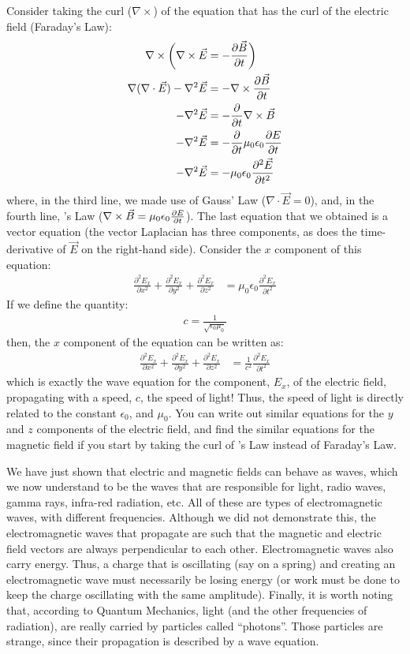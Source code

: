 Consider taking the curl ($\nabla \times$) of the equation that has the curl of the electric field (Faraday's Law):
\begin{align*}
\nabla \times \bigg(\nabla \times \vec E &= -\frac{\partial \vec B}{\partial t}\bigg)\\
\nabla(\nabla\cdot \vec E)-\nabla^2\vec E &= -\nabla \times \frac{\partial \vec B}{\partial t}\\
-\nabla^2\vec E &= - \frac{\partial }{\partial t} \nabla \times \vec B\\
-\nabla^2\vec E &= - \frac{\partial }{\partial t} \mu_0 \epsilon_0\frac{\partial E}{\partial t}\\
-\nabla^2\vec E &= - \mu_0 \epsilon_0\frac{\partial^2\vec E}{\partial t^2} 
\end{align*}
where, in the third line, we made use of Gauss' Law ($\nabla \cdot \vec E=0$), and, in the fourth line, \ampere's Law ($\nabla \times \vec B = \mu_0 \epsilon_0\frac{\partial E}{\partial t}$). The last equation that we obtained is a vector equation (the vector Laplacian has three components, as does the time-derivative of $\vec E$ on the right-hand side). Consider the $x$ component of this equation:
\begin{align*}
\frac{\partial^2 E_x}{\partial x^2}+\frac{\partial^2  E_x}{\partial y^2} + \frac{\partial^2 E_x}{\partial z^2}  &= \mu_0 \epsilon_0\frac{\partial^2 E_x}{\partial t^2} 
\end{align*}
If we define the quantity:
\begin{align*}
c = \frac{1}{\sqrt{\epsilon_0\mu_0}}
\end{align*}
then, the $x$ component of the equation can be written as:
\begin{align*}
\frac{\partial^2 E_x}{\partial x^2}+\frac{\partial^2  E_x}{\partial y^2} + \frac{\partial^2 E_x}{\partial z^2} &= \frac{1}{c^2}\frac{\partial^2 E_x}{\partial t^2} 
\end{align*}
which is exactly the wave equation for the component, $E_x$, of the electric field, propagating with a speed, $c$, the speed of light! Thus, the speed of light is directly related to the constant $\epsilon_0$, and $\mu_0$. You can write out similar equations for the $y$ and $z$ components of the electric field, and find the similar equations for the magnetic field if you start by taking the curl of \ampere's Law instead of Faraday's Law. 

We have just shown that electric and magnetic fields can behave as waves, which we now understand to be the waves that are responsible for light, radio waves, gamma rays, infra-red radiation, etc. All of these are types of electromagnetic waves, with different frequencies. Although we did not demonstrate this, the electromagnetic waves that propagate are such that the magnetic and electric field vectors are always perpendicular to each other. Electromagnetic waves also carry energy. Thus, a charge that is oscillating (say on a spring) and creating an electromagnetic wave must necessarily be losing energy (or work must be done to keep the charge oscillating with the same amplitude). Finally, it is worth noting that, according to Quantum Mechanics, light (and the other frequencies of radiation), are really carried by particles called ``photons''. Those particles are strange, since their propagation is described by a wave equation. 

